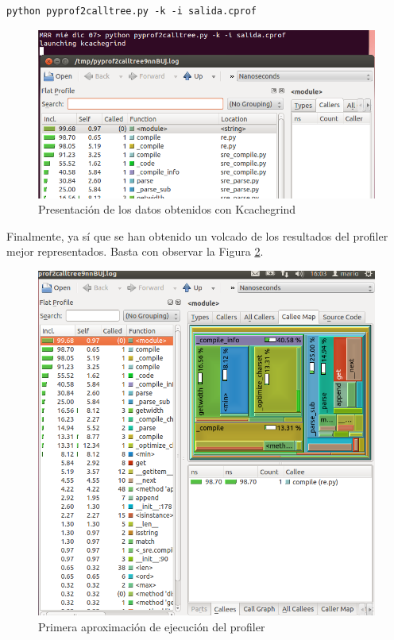 \begin{lstlisting}[style=fich]
python pyprof2calltree.py -k -i salida.cprof
\end{lstlisting}

\begin{figure}[H]
	\centering
	\includegraphics[scale=0.8]{figuras/ejercicio8/figura3.png} 
	\caption{Presentación de los datos obtenidos con Kcachegrind} 
	\label{fig:figura83}
\end{figure}

\newpage

Finalmente, ya sí que se han obtenido un volcado de los resultados del profiler mejor representados. Basta con observar la Figura \ref{fig:figura84}.

\begin{figure}[H]
	\centering
	\includegraphics[scale=0.8]{figuras/ejercicio8/figura4.png} 
	\caption{Primera aproximación de ejecución del profiler} 
	\label{fig:figura84}
\end{figure}

